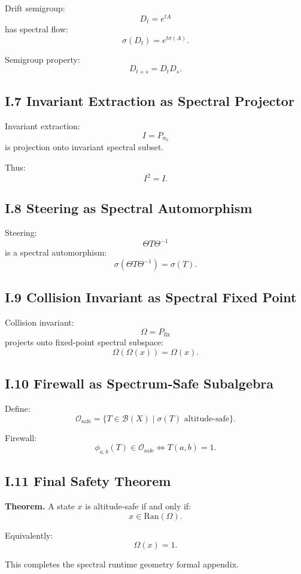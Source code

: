 Drift semigroup:
\[
D_t = e^{tA}
\]
has spectral flow:
\[
\sigma(D_t) = e^{t\sigma(A)}.
\]

Semigroup property:
\[
D_{t+s} = D_t D_s.
\]

\subsection*{I.7 Invariant Extraction as Spectral Projector}

Invariant extraction:
\[
I = P_{\sigma_0}
\]
is projection onto invariant spectral subset.

Thus:
\[
I^2 = I.
\]

\subsection*{I.8 Steering as Spectral Automorphism}

Steering:
\[
\Theta T \Theta^{-1}
\]
is a spectral automorphism:
\[
\sigma(\Theta T \Theta^{-1}) = \sigma(T).
\]

\subsection*{I.9 Collision Invariant as Spectral Fixed Point}

Collision invariant:
\[
\Omega = P_{\mathrm{fix}}
\]
projects onto fixed-point spectral subspace:
\[
\Omega(\Omega(x)) = \Omega(x).
\]

\subsection*{I.10 Firewall as Spectrum-Safe Subalgebra}

Define:
\[
\mathcal{O}_{\mathrm{safe}} =
\{ T \in \mathcal{B}(X) \mid \sigma(T) \text{ altitude-safe} \}.
\]

Firewall:
\[
\phi_{a,b}(T) \in \mathcal{O}_{\mathrm{safe}}
\iff
T(a,b)=1.
\]

\subsection*{I.11 Final Safety Theorem}

\textbf{Theorem.}  
A state $x$ is altitude-safe if and only if:
\[
x \in \mathrm{Ran}(\Omega).
\]

Equivalently:
\[
\Omega(x)=1.
\]

This completes the spectral runtime geometry formal appendix.
